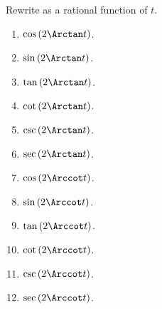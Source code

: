 Rewrite as a rational function of $t$.

\begin{multicols}{2}
\begin{enumerate}
\item $\cos \left(2\Arctan t\right)$.
\item $\sin \left(2\Arctan t\right)$.
\item $\tan \left(2\Arctan t\right)$.
\item $\cot \left(2\Arctan t\right)$.
\item $\csc \left(2\Arctan t\right)$.
\item $\sec \left(2\Arctan t\right)$.
\item $\cos \left(2\Arccot t\right)$.
\item $\sin \left(2\Arccot t\right)$.
\item $\tan \left(2\Arccot t\right)$.
\item $\cot \left(2\Arccot t\right)$.
\item $\csc \left(2\Arccot t\right)$.
\item $\sec \left(2\Arccot t\right)$.
\end{enumerate}
\end{multicols}